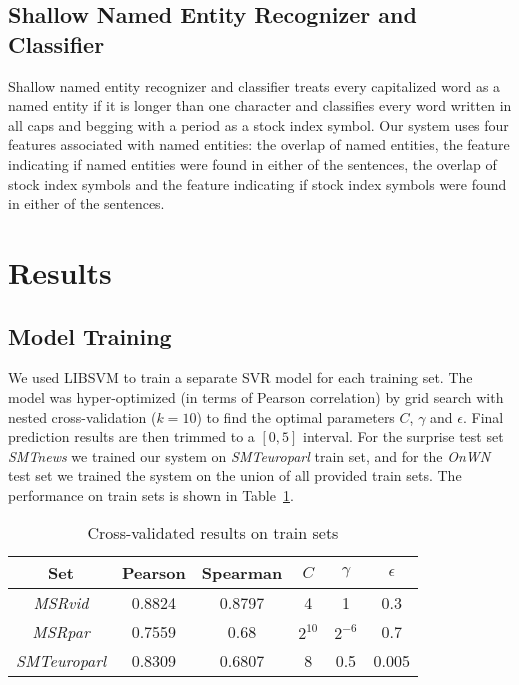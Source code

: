 \documentclass[10pt, a4paper]{article}
\begin{document}
\subsection{Shallow Named Entity Recognizer and Classifier}
Shallow named entity recognizer and classifier treats every capitalized word as a named entity if it is longer than one character and classifies every word written in all caps and begging with a period as a stock index symbol. Our system uses four features associated with named entities: the overlap of named entities, the feature indicating if named entities were found in either of the sentences, the overlap of stock index symbols and the feature indicating if stock index symbols were found in either of the sentences.

\section{Results}

\subsection{Model Training}

We used LIBSVM \citep{chang2011libsvm} to train a separate SVR model for each training set. The model was hyper-optimized (in terms of Pearson correlation) by grid search with nested cross-validation ($k=10$) to find the optimal parameters $C$, $\gamma$ and $\epsilon$. Final prediction results are then trimmed to a $[0,5]$ interval. For the surprise test set \textit{SMTnews} we trained our system on \textit{SMTeuroparl} train set, and for the \textit{OnWN} test set we trained the system on the union of all provided train sets. The performance on train sets is shown in Table~\ref{tab:train-results-table}.

\begin{table}[h]
\caption{Cross-validated results on train sets}
\label{tab:train-results-table}
\begin{center}
\begin{tabular}{cccccc}
\toprule
Set & Pearson & Spearman & $C$ & $\gamma$ & $\epsilon$ \\
\midrule
\textit{MSRvid} & 0.8824 & 0.8797 & 4 & 1 & 0.3 \\
\textit{MSRpar} & 0.7559 & 0.68 & $2^{10}$ & $2^{-6}$ & 0.7 \\
\textit{SMTeuroparl} & 0.8309 & 0.6807 & 8 & 0.5 & 0.005 \\
\bottomrule
\end{tabular}
\end{center}
\end{table}
\end{document}
